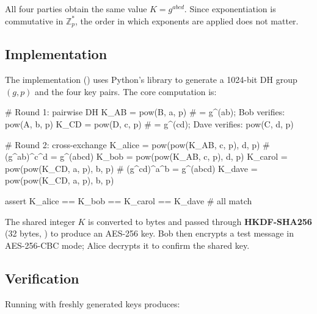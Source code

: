 \documentclass[twocolumn, 10pt]{article}
\begin{document}
All four parties obtain the same value $K = g^{abcd}$. Since exponentiation is commutative in $\mathbb{Z}_p^*$, the order in which exponents are applied does not matter.

\subsection{Implementation}

The implementation () uses Python's  library to generate a 1024-bit DH group $(g, p)$ and the four key pairs. The core computation is:

\begin{mycode}[Python]
# Round 1: pairwise DH
K_AB = pow(B, a, p)   # = g^(ab); Bob verifies: pow(A, b, p)
K_CD = pow(D, c, p)   # = g^(cd); Dave verifies: pow(C, d, p)

# Round 2: cross-exchange
K_alice = pow(pow(K_AB, c, p), d, p)  # (g^ab)^c^d = g^(abcd)
K_bob   = pow(pow(K_AB, c, p), d, p)
K_carol = pow(pow(K_CD, a, p), b, p)  # (g^cd)^a^b = g^(abcd)
K_dave  = pow(pow(K_CD, a, p), b, p)

assert K_alice == K_bob == K_carol == K_dave  # all match
\end{mycode}

The shared integer $K$ is converted to bytes and passed through \textbf{HKDF-SHA256} (32 bytes, ) to produce an AES-256 key. Bob then encrypts a test message in AES-256-CBC mode; Alice decrypts it to confirm the shared key.

\subsection{Verification}

Running  with freshly generated keys produces:
\end{document}
